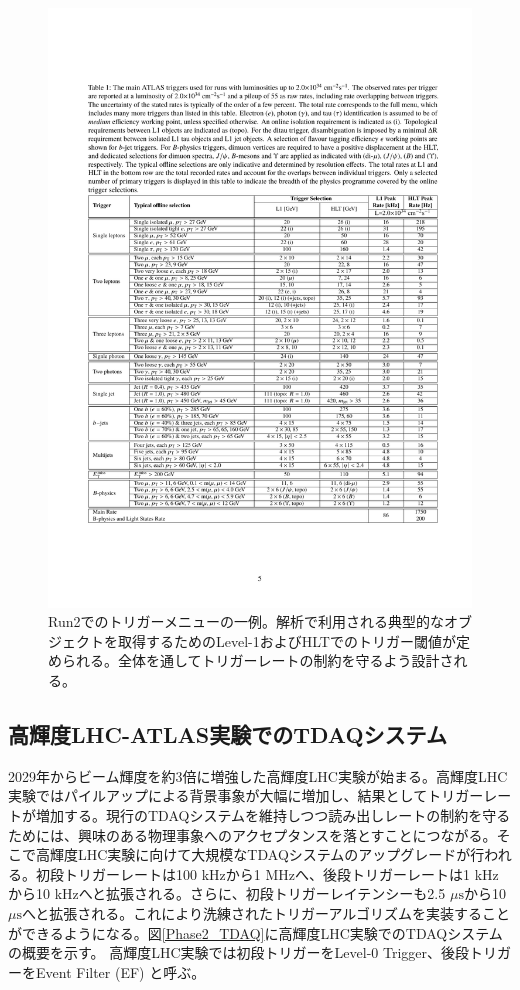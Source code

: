     \begin{figure} 
    \centering
    \includegraphics[width=16cm]{fig/Intro/Run2_Triggermenu.pdf}
    \caption[Run2でのトリガーメニューの一例]{Run2でのトリガーメニューの一例\cite{Run2_Triggermenu}。解析で利用される典型的なオブジェクトを取得するためのLevel-1およびHLTでのトリガー閾値が定められる。全体を通してトリガーレートの制約を守るよう設計される。}
    \label{Run2_Triggermenu}
    \end{figure}

    \subsection{高輝度LHC-ATLAS実験でのTDAQシステム}
2029年からビーム輝度を約3倍に増強した高輝度LHC実験が始まる。高輝度LHC実験ではパイルアップによる背景事象が大幅に増加し、結果としてトリガーレートが増加する。現行のTDAQシステムを維持しつつ読み出しレートの制約を守るためには、興味のある物理事象へのアクセプタンスを落とすことにつながる。そこで高輝度LHC実験に向けて大規模なTDAQシステムのアップグレードが行われる。初段トリガーレートは100 kHzから1 MHzへ、後段トリガーレートは1 kHzから10 kHzへと拡張される。さらに、初段トリガーレイテンシーも2.5 $\mu\mathrm{s}$から10 $\mu\mathrm{s}$へと拡張される。これにより洗練されたトリガーアルゴリズムを実装することができるようになる。図\ref{Phase2_TDAQ}に高輝度LHC実験でのTDAQシステムの概要を示す。
高輝度LHC実験では初段トリガーをLevel-0 Trigger、後段トリガーをEvent Filter (EF) と呼ぶ。

